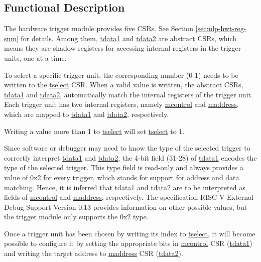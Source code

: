 \documentclass[main\_\_EN.tex]{subfiles}
\begin{document}
\subsection{Functional Description}
\label{sec:ulp-hwt-func-descr}


The hardware trigger module provides five CSRs. See Section \ref{sec:ulp-hwt-reg-sum} for details. Among them, \hyperref[regdesc:LPTDATA1]{tdata1} and \hyperref[regdesc:LPTDATA2]{tdata2} are abstract CSRs, which means they are shadow registers for accessing internal registers in the trigger units, one at a time.

To select a specific trigger unit, the corresponding number (0-1) needs to be written to the \hyperref[regdesc:LPTSELECT]{tselect} CSR. When a valid value is written, the abstract CSRs, \hyperref[regdesc:LPTDATA1]{tdata1} and \hyperref[regdesc:LPTDATA2]{tdata2}, automatically match the internal registers of the trigger unit. Each trigger unit has two internal registers, namely \hyperref[regdesc:LPMCONTROL]{mcontrol} and \hyperref[regdesc:LPMADDRESS]{maddress}, which are mapped to \hyperref[regdesc:LPTDATA1]{tdata1} and \hyperref[regdesc:LPTDATA2]{tdata2}, respectively.

Writing a value more than 1 to \hyperref[regdesc:LPTSELECT]{tselect} will set \hyperref[regdesc:LPTSELECT]{tselect} to 1.

Since software or debugger may need to know the type of the selected trigger to correctly interpret \hyperref[regdesc:LPTDATA1]{tdata1} and \hyperref[regdesc:LPTDATA2]{tdata2}, the 4-bit field (31-28) of \hyperref[regdesc:LPTDATA1]{tdata1} encodes the type of the selected trigger. This type field is read-only and always provides a value of 0x2 for every trigger, which stands for support for address and data matching. Hence, it is inferred that \hyperref[regdesc:LPTDATA1]{tdata1} and \hyperref[regdesc:LPTDATA2]{tdata2} are to be interpreted as fields of \hyperref[regdesc:LPMCONTROL]{mcontrol} and \hyperref[regdesc:LPMADDRESS]{maddress}, respectively. The specification RISC-V External Debug Support Version 0.13 provides information on other possible values, but the trigger module only supports the 0x2 type.

Once a trigger unit has been chosen by writing its index to \hyperref[regdesc:LPTSELECT]{tselect}, it will become possible to configure it by setting the appropriate bits in \hyperref[regdesc:LPMCONTROL]{mcontrol} CSR (\hyperref[regdesc:LPTDATA1]{tdata1}) and writing the target address to \hyperref[regdesc:LPMADDRESS]{maddress} CSR (\hyperref[regdesc:LPTDATA2]{tdata2}).
\end{document}
